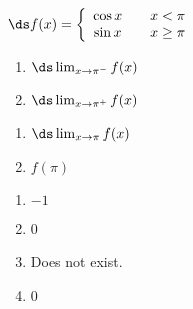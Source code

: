{$\ds f(x) = \left\{\begin{array}{ccc}
	\cos x & & x<\pi \\
	\sin x & & x\geq \pi
	\end{array}
	\right.
$

\noindent\begin{minipage}[t]{.49\linewidth}
\begin{enumerate}
\item		$\ds \lim_{x\to \pi^-} f(x)$
\item		$\ds \lim_{x\to \pi^+} f(x)$
\end{enumerate}
\end{minipage}
\noindent\begin{minipage}[t]{.49\linewidth}
\begin{enumerate}\addtocounter{enumii}{2}
\item		$\ds \lim_{x\to \pi} f(x)$
\item		$f(\pi)$
\end{enumerate}
\end{minipage}
}
{\begin{enumerate}
\item		$-1$
\item		0
\item		Does not exist.
\item		0
\end{enumerate}
}


